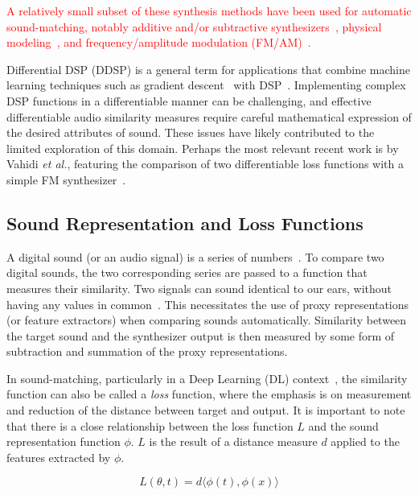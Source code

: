 \documentclass[lettersize,journal]{IEEEtran}
\newcommand{\todo}[1]{\textcolor{red}{#1}}
\providecommand{\gls}[1]{#1}
\begin{document}
\todo{A relatively small subset of these synthesis methods have been used for automatic sound-matching, notably additive and/or subtractive synthesizers~\cite{esling2019flow,yee2018automatic,mitchell2007evolutionary,salimi2020make}, physical modeling~\cite{riionheimo2003parameter}, and frequency/amplitude modulation (\gls{FM}/\gls{AM})~\cite{horner1993machine,vahidi2023mesostructures}. }

Differential DSP (\gls{DDSP}) is a general term for applications that combine machine learning techniques such as gradient descent~\cite{goodfellow2016deep,boyd2004convex} with DSP~\cite{engel2020ddsp}. Implementing complex DSP functions in a differentiable manner can be challenging, and effective differentiable audio similarity measures require careful mathematical expression of the desired attributes of sound. These issues have likely contributed to the limited exploration of this domain. Perhaps the most relevant recent work is by Vahidi \textit{et al.}, featuring the comparison of two differentiable loss functions with a simple FM synthesizer~\cite{vahidi2023mesostructures}. 

\subsection{Sound Representation and Loss Functions}
\label{sec:loss_funcs}
A digital sound (or an audio signal) is a series of numbers~\cite{smith1991viewpoints,smith2007mathematics}. To compare two digital sounds, the two corresponding series are passed to a function that measures their similarity. Two signals can sound identical to our ears, without having any values in common~\cite{moore2012introduction}. This necessitates the use of proxy representations (or feature extractors) when comparing sounds automatically. Similarity between the target sound and the synthesizer output is then measured by some form of subtraction and summation of the proxy representations.

In sound-matching, particularly in a Deep Learning (\gls{DL}) context~\cite{goodfellow2016deep}, the similarity function can also be called a \textit{loss} function, where the emphasis is on measurement and reduction of the distance between target and output. It is important to note that there is a close relationship between the loss function $L$ and the sound representation function $\phi$. $L$ is the result of a distance measure $d$ applied to the features extracted by $\phi$. 

\[
L(\theta, t) = d\langle\phi(t),\phi(x)\rangle
\]
\end{document}
